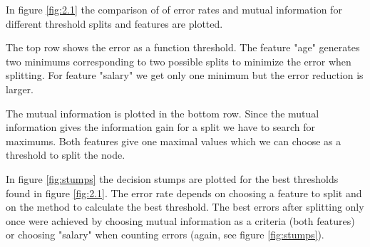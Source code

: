 \documentclass[12pt]{article}
\begin{document}
In figure \ref{fig:2.1} the comparison of of error rates and mutual information for different threshold splits and features are plotted. \par 
The top row shows the error as a function threshold. The feature "age" generates two minimums corresponding to two possible splits to minimize the error when splitting. For feature "salary" we get only one minimum but the error reduction is larger. \par 
The mutual information is plotted in the bottom row. Since the mutual information gives the information gain for a split we have to search for maximums. Both features give one maximal values which we can choose as a threshold to split the node. \par
In figure \ref{fig:stumps} the decision stumps are plotted for the best thresholds found in figure \ref{fig:2.1}. The error rate depends on choosing a feature to split and on the method to calculate the best threshold. The best errors after splitting only once were achieved by choosing mutual information as a criteria (both features) or choosing "salary" when counting errors (again, see figure \ref{fig:stumps}).
\end{document}
